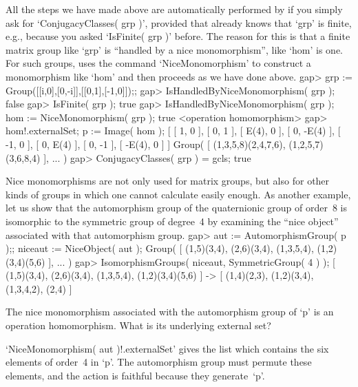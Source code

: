 All the steps we have made above are automatically performed by {\GAP} if
you  simply   ask for `ConjugacyClasses(  grp  )',   provided that {\GAP}
already knows that  `grp' is finite,  e.g., because you asked  `IsFinite(
grp )'  before. The reason  for this is that a   finite matrix group like
`grp' is ``handled by a nice monomorphism'',  like `hom' is one. For such
groups,  {\GAP} uses  the command   `NiceMonomorphism'   to construct   a
monomorphism like `hom' and then proceeds as we have done above.
\beginexample
    gap> grp := Group([[i,0],[0,-i]],[[0,1],[-1,0]]);;
    gap> IsHandledByNiceMonomorphism( grp );
    false
    gap> IsFinite( grp );
    true
    gap> IsHandledByNiceMonomorphism( grp ); hom := NiceMonomorphism( grp );
    true
    <operation homomorphism>
    gap> hom!.externalSet; p := Image( hom );
    [ [ 1, 0 ], [ 0, 1 ], [ E(4), 0 ], [ 0, -E(4) ], [ -1, 0 ], [ 0, E(4) ], 
      [ 0, -1 ], [ -E(4), 0 ] ]
    Group( [ (1,3,5,8)(2,4,7,6), (1,2,5,7)(3,6,8,4) ], ... )
    gap> ConjugacyClasses( grp ) = gcls;
    true
\endexample

Nice monomorphisms are   not only used  for matrix  groups, but  also for
other kinds of  groups  in which  one cannot calculate  easily enough. As
another   example, let  us    show that the   automorphism  group  of the
quaternionic  group of  order~8 is isomorphic  to  the symmetric group of
degree~4   by   examining  the ``nice   object''    associated with  that
automorphism group.
\beginexample
    gap> aut := AutomorphismGroup( p );; niceaut := NiceObject( aut );
    Group( [ (1,5)(3,4), (2,6)(3,4), (1,3,5,4), (1,2)(3,4)(5,6) ], ... )
    gap> IsomorphismGroups( niceaut, SymmetricGroup( 4 ) );
    [ (1,5)(3,4), (2,6)(3,4), (1,3,5,4), (1,2)(3,4)(5,6) ] -> 
    [ (1,4)(2,3), (1,2)(3,4), (1,3,4,2), (2,4) ]
\endexample

\exercise The nice monomorphism associated with the automorphism group of
`p' is an operation homomorphism. What is its underlying external set?

\answer `NiceMonomorphism( aut )!.externalSet' gives the list
\begintt
    [ (1,2,5,7)(3,6,8,4), (1,3,5,8)(2,4,7,6), (1,4,5,6)(2,8,7,3), 
      (1,6,5,4)(2,3,7,8), (1,7,5,2)(3,4,8,6), (1,8,5,3)(2,6,7,4) ]
\endtt
which contains the six elements of order~4 in `p'. The automorphism group
must permute  these elements,  and the  action  is faithful because  they
generate~`p'.


